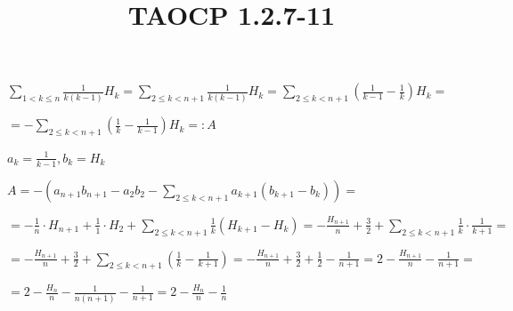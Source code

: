\documentclass{article}
\title{TAOCP 1.2.7\mbox{-}11}
\begin{document}
\maketitle

\( \sum_{1<k\leq n} \frac{1}{k(k-1)}H_{k} = \sum_{2 \leq k < n + 1} \frac{1}{k(k-1)}H_{k} = \sum_{2 \leq k < n + 1} (\frac{1}{k-1} - \frac{1}{k}) H_{k} = \)

\( = - \sum_{2 \leq k < n + 1} (\frac{1}{k} - \frac{1}{k-1}) H_{k} =: A \)

\( a_{k} = \frac{1}{k-1}, b_{k} = H_{k} \)

\( A = -(a_{n+1}b_{n+1} - a_{2}b_{2} - \sum_{2\leq k < n + 1} a_{k+1}(b_{k+1}-b_{k})) = \)

\( = -\frac{1}{n} \cdot H_{n+1} + \frac{1}{1} \cdot H_{2} + \sum_{2\leq k < n + 1} \frac{1}{k}(H_{k+1}-H_{k}) = -\frac{H_{n+1}}{n} + \frac{3}{2} + \sum_{2\leq k < n+1}\frac{1}{k} \cdot \frac{1}{k+1} = \)

\( = -\frac{H_{n+1}}{n} + \frac{3}{2} + \sum_{2\leq k < n+1}(\frac{1}{k} - \frac{1}{k+1}) = -\frac{H_{n+1}}{n} + \frac{3}{2} + \frac{1}{2} - \frac{1}{n+1} = 2 - \frac{H_{n+1}}{n} - \frac{1}{n+1} = \)

\( = 2 - \frac{H_{n}}{n} - \frac{1}{n(n+1)} - \frac{1}{n+1} = 2 - \frac{H_{n}}{n} - \frac{1}{n} \)
\end{document}
